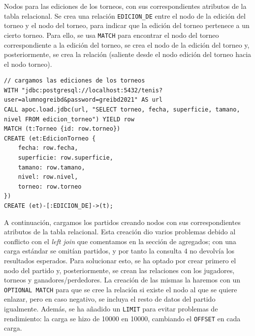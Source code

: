Nodos para las ediciones de los torneos, con sus correspondientes atributos de la tabla relacional. Se crea una relación \texttt{EDICION\_DE} entre el nodo de la edición del torneo y el nodo del torneo, para indicar que la edición del torneo pertenece a un cierto torneo. Para ello, se usa \texttt{MATCH} para encontrar el nodo del torneo correspondiente a la edición del torneo, se crea el nodo de la edición del torneo y, posteriormente, se crea la relación (saliente desde el nodo edición del torneo hacia el nodo torneo).

\begin{verbatim}
// cargamos las ediciones de los torneos
WITH "jdbc:postgresql://localhost:5432/tenis?user=alumnogreibd&password=greibd2021" AS url
CALL apoc.load.jdbc(url, "SELECT torneo, fecha, superficie, tamano, nivel FROM edicion_torneo") YIELD row
MATCH (t:Torneo {id: row.torneo})
CREATE (et:EdicionTorneo {
    fecha: row.fecha,
    superficie: row.superficie,
    tamano: row.tamano,
    nivel: row.nivel,
    torneo: row.torneo
})
CREATE (et)-[:EDICION_DE]->(t);
\end{verbatim}

A continuación, cargamos los partidos creando nodos con sus correspondientes atributos de la tabla relacional. Esta creación dio varios problemas debido al conflicto con el \textit{left join} que comentamos en la sección de agregados; con una carga estándar se omitían partidos, y por tanto la consulta 4 no devolvía los resultados esperados. Para solucionar esto, se ha optado por crear primero el nodo del partido y, posteriormente, se crean las relaciones con los jugadores, torneos y ganadores/perdedores. La creación de las mismas la haremos con un \texttt{OPTIONAL MATCH} para que se cree la relación si existe el nodo al que se quiere enlazar, pero en caso negativo, se incluya el resto de datos del partido igualmente. Además, se ha añadido un \texttt{LIMIT} para evitar problemas de rendimiento: la carga se hizo de 10000 en 10000, cambiando el \texttt{OFFSET} en cada carga. \\

